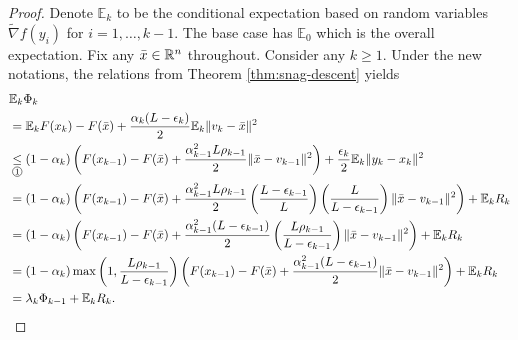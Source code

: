 \documentclass[12pt]{article}
\newcommand{\expect}{\ensuremath{\mathbb E}}
\begin{document}
        \begin{proof}
            Denote $\expect_k$ to be the conditional expectation based on random variables $\tilde \nabla f(y_i)$ for $i = 1, \ldots, k - 1$. 
            The base case has $\expect_0$ which is the overall expectation. 
            Fix any $\bar x \in \mathbb R^n$ throughout. 
            Consider any $k \ge 1$. 
            Under the new notations, the relations from Theorem \ref{thm:snag-descent} yields 
            \begin{align*}
                & \expect_k \Phi_k 
                \\
                &= \expect_k F(x_k) - F(\bar x) + \frac{\alpha_k(L - \epsilon_k)}{2}\expect_k \Vert v_k - \bar x\Vert^2
                \\
                &\underset{\circled{1}}{\le} 
                (1 - \alpha_k)\left(
                    F(x_{k - 1})- F(\bar x) + \frac{\alpha_{k - 1}^2 L \rho_{k - 1}}{2}\Vert \bar x - v_{k - 1}\Vert^2
                \right)
                + \frac{\epsilon_k}{2}\expect_k \Vert y_k - x_k\Vert^2
                \\
                &= (1 - \alpha_k)\left(
                    F(x_{k - 1})- F(\bar x) + \frac{\alpha_{k - 1}^2 L \rho_{k - 1}}{2}
                    \left(
                        \frac{L - \epsilon_{k - 1}}{L}
                    \right)
                    \left(
                        \frac{L}{L - \epsilon_{k - 1}}
                    \right)
                    \Vert \bar x - v_{k - 1}\Vert^2
                \right)
                + \expect_k R_k
                \\
                &= (1 - \alpha_k)\left(
                    F(x_{k - 1})- F(\bar x) 
                    + \frac{\alpha_{k - 1}^2(L - \epsilon_{k - 1})}{2}
                    \left(
                        \frac{L\rho_{k - 1}}{L - \epsilon_{k - 1}}
                    \right)
                    \Vert \bar x - v_{k - 1}\Vert^2
                \right)
                + \expect_k R_k
                \\
                &= (1 - \alpha_k)\max\left(
                    1, \frac{L\rho_{k - 1}}{L - \epsilon_{k - 1}}
                \right)\left(
                    F(x_{k - 1})- F(\bar x) 
                    + \frac{\alpha_{k - 1}^2(L - \epsilon_{k - 1})}{2}
                    \Vert \bar x - v_{k - 1}\Vert^2
                \right)
                + \expect_k R_k
                \\
                &= \lambda_k \Phi_{k - 1} + \expect_k R_k.

\end{align*}
\end{proof}
\end{document}
